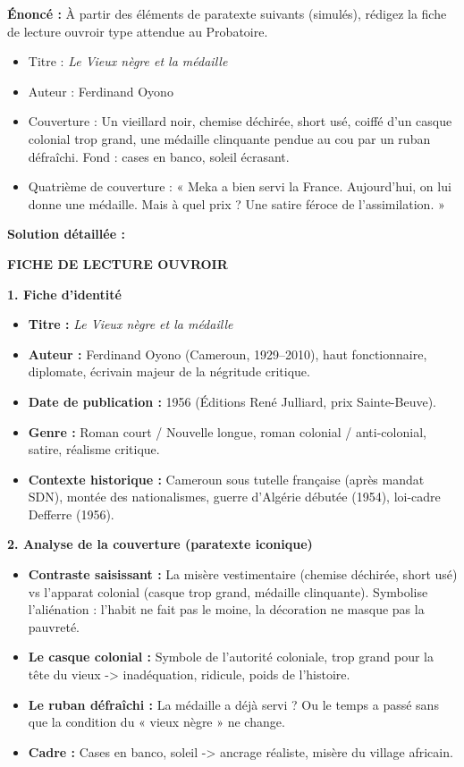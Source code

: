 \documentclass[11pt]{article}
\newcommand{\cle}[1]{{\popxbold\color{popdark}#1}}
\begin{document}
\begin{exoresolu}
\textbf{Énoncé :} À partir des éléments de paratexte suivants (simulés), rédigez la fiche de lecture ouvroir type attendue au Probatoire.
\begin{itemize}
    \item Titre : \emph{Le Vieux nègre et la médaille}
    \item Auteur : Ferdinand Oyono
    \item Couverture : Un vieillard noir, chemise déchirée, short usé, coiffé d'un casque colonial trop grand, une médaille clinquante pendue au cou par un ruban défraîchi. Fond : cases en banco, soleil écrasant.
    \item Quatrième de couverture : « Meka a bien servi la France. Aujourd'hui, on lui donne une médaille. Mais à quel prix ? Une satire féroce de l'assimilation. »
\end{itemize}
\tcblower
\textbf{Solution détaillée :}

\textbf{FICHE DE LECTURE OUVROIR}

\textbf{1. Fiche d'identité}
\begin{itemize}
    \item \textbf{Titre :} \emph{Le Vieux nègre et la médaille}
    \item \textbf{Auteur :} Ferdinand Oyono (Cameroun, 1929–2010), haut fonctionnaire, diplomate, écrivain majeur de la négritude critique.
    \item \textbf{Date de publication :} 1956 (Éditions René Julliard, prix Sainte-Beuve).
    \item \textbf{Genre :} Roman court / Nouvelle longue, \cle{roman colonial} / \cle{anti-colonial}, \cle{satire}, \cle{réalisme critique}.
    \item \textbf{Contexte historique :} Cameroun sous tutelle française (après mandat SDN), montée des nationalismes, guerre d'Algérie débutée (1954), loi-cadre Defferre (1956).
\end{itemize}

\textbf{2. Analyse de la couverture (paratexte iconique)}
\begin{itemize}
    \item \textbf{Contraste saisissant :} La misère vestimentaire (chemise déchirée, short usé) vs l'apparat colonial (casque trop grand, médaille clinquante). Symbolise l'\cle{aliénation} : l'habit ne fait pas le moine, la décoration ne masque pas la pauvreté.
    \item \textbf{Le casque colonial :} Symbole de l'autorité coloniale, trop grand pour la tête du vieux -> inadéquation, ridicule, poids de l'histoire.
    \item \textbf{Le ruban défraîchi :} La médaille a déjà servi ? Ou le temps a passé sans que la condition du « vieux nègre » ne change.
    \item \textbf{Cadre :} Cases en banco, soleil -> ancrage réaliste, misère du village africain.
\end{itemize}


\end{exoresolu}
\end{document}
